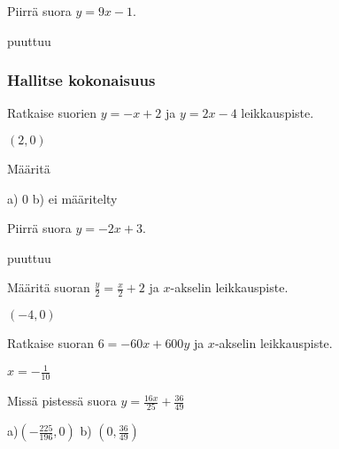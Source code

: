 \begin{tehtavasivu}
\begin{tehtava}
Piirrä suora $y=9x-1$.
\begin{vastaus}
puuttuu
\end{vastaus}
\end{tehtava}

\subsubsection*{Hallitse kokonaisuus}

\begin{tehtava}
Ratkaise suorien $y=-x+2$ ja $y=2x-4$ leikkauspiste.
\begin{vastaus}
$(2, 0)$
\end{vastaus}
\end{tehtava}

\begin{tehtava}
Määritä
\begin{vastaus}
a) $0$ b) ei määritelty %
\end{vastaus}
\end{tehtava}

\begin{tehtava}
Piirrä suora $y=-2x+3$.
\begin{vastaus}
puuttuu
\end{vastaus}
\end{tehtava}

\begin{tehtava}
Määritä suoran $\frac{y}{2}=\frac{x}{2}+2$ ja $x$-akselin leikkauspiste.
\begin{vastaus}
$(-4, 0)$
\end{vastaus}
\end{tehtava}

\begin{tehtava}
Ratkaise suoran $6=-60x+600y$ ja $x$-akselin leikkauspiste.
\begin{vastaus}
$x=-\frac{1}{10}$
\end{vastaus}
\end{tehtava}

\begin{tehtava}
Missä pistessä suora $y=\frac{16x}{25}+\frac{36}{49}$
\begin{vastaus}
a)$(-\frac{225}{196}, 0)$ b) $(0, \frac{36}{49})$
\end{vastaus}
\end{tehtava}


\end{tehtavasivu}
